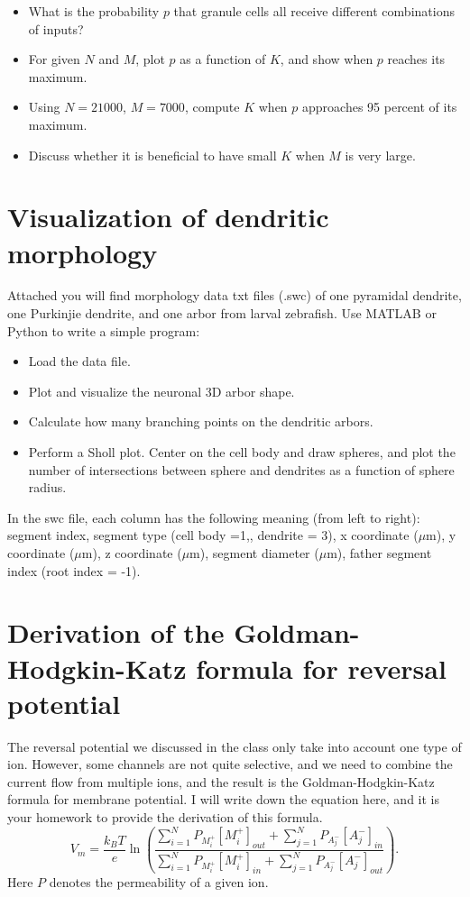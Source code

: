 \documentclass{article}
\begin{document}
\begin{itemize}
\item What is the probability $p$ that granule cells all receive different combinations of inputs?
\item For given $N$ and $M$, plot $p$ as a function of $K$, and show when $p$ reaches its maximum.
\item Using $N = 21000$, $M = 7000$, compute $K$ when $p$ approaches 95 percent of its maximum.
\item Discuss whether it is beneficial to have small $K$ when $M$ is very large.
\end{itemize}


\section*{Visualization of dendritic morphology}

Attached you will find morphology data txt files (.swc) of one pyramidal dendrite, one Purkinjie dendrite, and one arbor from larval zebrafish. Use MATLAB or Python to write a simple program: 
\begin{itemize}
\item Load the data file. 
\item Plot and visualize the neuronal 3D arbor shape. 
\item Calculate how many branching points on the dendritic arbors.
\item Perform a Sholl plot. Center on the cell body and draw spheres, and plot the number of intersections between sphere and dendrites as a function of sphere radius.  
\end{itemize}
In the swc file, each column has the following meaning (from left to right): segment index, segment type (cell body =1,, dendrite = 3), x coordinate ($\mu$m), y coordinate ($\mu$m), z coordinate ($\mu$m), segment diameter ($\mu$m), father segment index (root index = -1). 

\section*{Derivation of the Goldman-Hodgkin-Katz formula for reversal potential}

The reversal potential we discussed in the class only take into account one type of ion. However, some channels are not quite selective, and we need to combine the current flow from multiple ions, and the result is the Goldman-Hodgkin-Katz formula for membrane potential. I will write down the equation here, and it is your homework to provide the derivation of this formula.
\begin{equation} V_{m}=\frac{k_{B}T}{e}\ln\left(\frac{\sum_{i=1}^{N}P_{M_{i}^{+}}[M_{i}^{+}]_{out}+\sum_{j=1}^{N}P_{A_{j}^{-}}[A_{j}^{-}]_{in}}{\sum_{i=1}^{N}P_{M_{i}^{+}}[M_{i}^{+}]_{in}+\sum_{j=1}^{N}P_{A_{j}^{-}}[A_{j}^{-}]_{out}}\right).
\end{equation}
Here $P$ denotes the permeability of a given ion.
\end{document}

